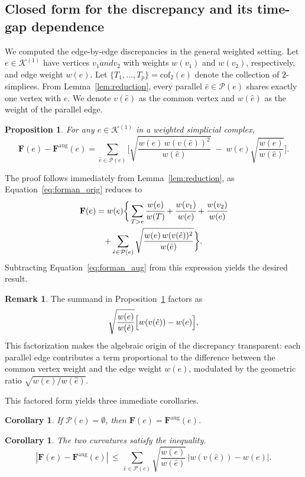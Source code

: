 \documentclass[
    pre,
    twocolumn,
    superscriptaddress,
    showpacs,
    nofootinbib,
    amsmath,
    amssymb,
    floatfix
]{revtex4-2}
\newcommand{\K}{\mathcal{K}}
\newcommand{\F}{\mathbf{F}}        %
\newcommand{\Faug}{\F^{\mathrm{aug}}}
\theoremstyle{plain} %
\newtheorem{corollary}[theorem]{\indent Corollary}
\newtheorem{proposition}[theorem]{\indent Proposition}
\theoremstyle{definition} %
\newtheorem{remark}{\indent Remark}
\begin{document}
\subsection{Closed form for the discrepancy and its time-gap dependence}\label{ssec:discrepancy}

We computed the edge-by-edge discrepancies in the general weighted setting.
Let $e\in\K^{(1)}$ have vertices $v_1 and v_2$ with weights $w(v_1)$ and $w(v_2)$, respectively, and edge weight $w(e)$. Let $\{T_1,\ldots,T_p\}=\mathrm{cof}_2(e)$ denote the collection of $2$-simplices.
From Lemma~\ref{lem:reduction}, every parallel $\hat e\in\mathcal P(e)$ shares exactly one vertex with $e$.
We denote $v(\hat e)$ as the common vertex and $w(\hat e)$ as the weight of the parallel edge.

\begin{proposition}\label{prop:discrepancy}
For any $e\in\K^{(1)}$ in a weighted simplicial complex,
\begin{equation*}
\F(e)-\Faug(e) =
\sum_{\hat e\in\mathcal P(e)}
   \!\Biggl[
     \sqrt{\frac{w(e)\,w(v(\hat e))^2}{w(\hat e)}}
     \;-\;
     w(e)\sqrt{\frac{w(e)}{w(\hat e)}}
   \Biggr].
\end{equation*}
\end{proposition}
The proof follows immediately from Lemma~\ref{lem:reduction}, as Equation~\eqref{eq:forman_orig} reduces to
\begin{multline*}
\F(e) = w(e) \biggr\{\sum_{T>e}\cfrac{w(e)}{w(T)} + \cfrac{w(v_1)}{w(e)} + \cfrac{w(v_2)}{w(e)}\\
+ \sum_{\hat e\in\mathcal P(e)}\sqrt{\frac{w(e)\,w(v(\hat e))^2}{w(\hat e)}} \biggr\}.
\end{multline*}
Subtracting Equation~\eqref{eq:forman_aug} from this expression yields the desired result.

\begin{remark}
The summand in Proposition~\ref{prop:discrepancy} factors as
\begin{equation}\label{eq:summand_factored}
\sqrt{\frac{w(e)}{w(\hat e)}}
\Bigl[w(v(\hat e)) - w(e)\Bigr],
\end{equation}
This factorization makes the algebraic origin of the discrepancy transparent: each parallel edge contributes a term proportional to the difference between the common vertex weight and the edge weight $w(e)$, modulated by the geometric ratio $\sqrt{w(e)/w(\hat e)}$.
\end{remark}

This factored form yields three immediate corollaries.
\begin{corollary}\label{cor:no_parallel}
If $\mathcal P(e)=\emptyset$, then $\F(e)=\Faug(e)$.
\end{corollary}
\begin{corollary}\label{cor:bound}
The two curvatures satisfy the inequality.
\begin{equation}\label{eq:abs_bound}
|\F(e)-\Faug(e)|
\,\leq\,
\sum_{\hat e\in\mathcal P(e)}
\sqrt{\frac{w(e)}{w(\hat e)}}\,
\bigl|w(v(\hat e))-w(e)\bigr|.
\end{equation}
\end{corollary}
\end{document}
